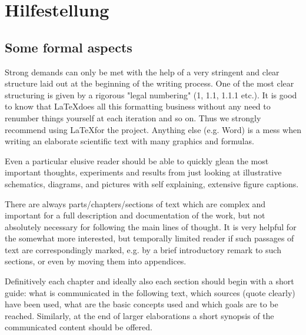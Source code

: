 %
%
%
%

\chapter*{Hilfestellung}
\label{chap:Hilfe}

\section*{Some formal aspects}
\label{sec:formalaspects}

Strong demands can only be met with the help of a very stringent and clear structure laid out at the beginning of the writing process. One of the most clear structuring is given by a rigorous "legal numbering" (1, 1.1, 1.1.1 etc.). It is good to know that \LaTeX does all this formatting business without any need to renumber things yourself at each iteration and so on. Thus we strongly recommend using \LaTeX for the project. Anything else (e.g. Word) is a mess when writing an elaborate scientific text with many graphics and formulas.

Even a particular elusive reader should be able to quickly glean the most important thoughts, experiments and results from just looking at illustrative schematics, diagrams, and pictures with self explaining, extensive figure captions.

There are always parts/chapters/sections of text which are complex and important for a full description and documentation of the work, but not absolutely necessary for following the main lines of thought. It is very helpful for the somewhat more interested, but temporally limited reader if such passages of text are correspondingly marked, e.g. by a brief introductory remark to such sections, or even by moving them into appendices.

Definitively each chapter and ideally also each section should begin with a short guide: what is communicated in the following text, which sources (quote clearly) have been used, what are the basic concepts used and which goals are to be reached. Similarly, at the end of larger elaborations a short synopsis of the communicated content should be
offered.

